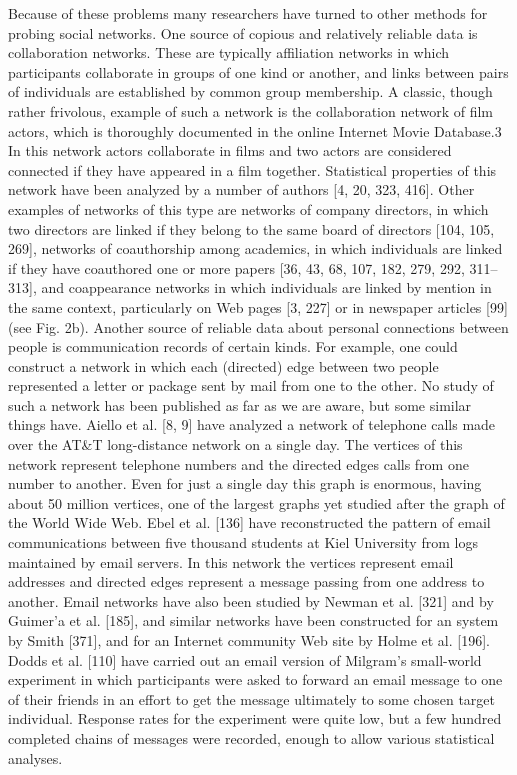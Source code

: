       Because of these problems many researchers have turned to other methods for probing social networks. One source of copious and relatively reliable data is collaboration networks. These are typically affiliation networks in which participants collaborate in groups of one kind or another, and links between pairs of individuals are established by common group membership. A classic, though rather frivolous, example of such a network is the collaboration network of film actors, which is thoroughly documented in the online Internet Movie Database.3 In this network actors collaborate in films and two actors are considered connected if they have appeared in a film together. Statistical properties of this network have been analyzed by a number of authors [4, 20, 323, 416]. Other examples of networks of this type are networks of company directors, in which two directors are linked if they belong to the same board of directors [104, 105, 269], networks of coauthorship among academics, in which individuals are linked if they have coauthored one or more papers [36, 43, 68, 107, 182, 279, 292, 311–313], and coappearance networks in which individuals are linked by mention in the same context, particularly on Web pages [3, 227] or in newspaper articles [99] (see Fig. 2b). Another source of reliable data about personal connections between people is communication records of certain kinds. For example, one could construct a network in which each (directed) edge between two people represented a letter or package sent by mail from one to the other. No study of such a network has been published as far as we are aware, but some similar things have. Aiello et al. [8, 9] have analyzed a network of telephone calls made over the AT\&T long-distance network on a single day. The vertices of this network represent telephone numbers and the directed edges calls from one number to another. Even for just a single day this graph is enormous, having about 50 million vertices, one of the largest graphs yet studied after the graph of the World Wide Web. Ebel et al. [136] have reconstructed the pattern of email communications between five thousand students at Kiel University from logs maintained by email servers. In this network the vertices represent email addresses and directed edges represent a message passing from one address to another. Email networks have also been studied by Newman et al. [321] and by Guimer'a et al. [185], and similar networks have been constructed for an  system by Smith [371], and for an Internet community Web site by Holme et al. [196]. Dodds et al. [110] have carried out an email version of Milgram's small-world experiment in which participants were asked to forward an email message to one of their friends in an effort to get the message ultimately to some chosen target individual. Response rates for the experiment were quite low, but a few hundred completed chains of messages were recorded, enough to allow various statistical analyses.
      
